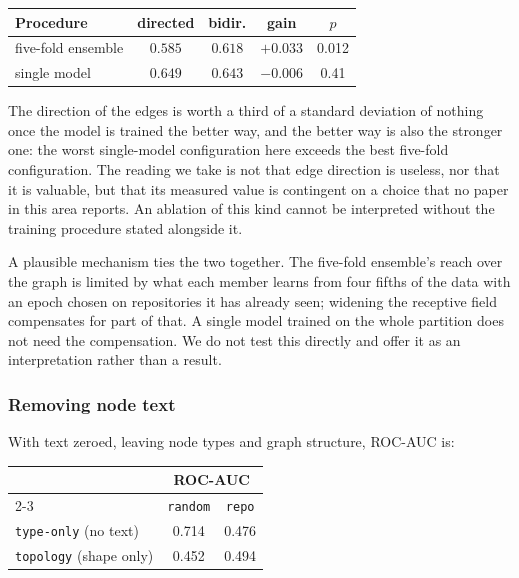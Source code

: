\begin{center}
\small
\small
\begin{tabular}{lcccc}
\toprule
\textbf{Procedure} & \textbf{directed} & \textbf{bidir.} & \textbf{gain} & \textbf{$p$} \\
\midrule
five-fold ensemble & $0.585$ & $0.618$ & $+0.033$ & 0.012 \\
single model       & $0.649$ & $0.643$ & $-0.006$ & 0.41 \\
\bottomrule
\end{tabular}
\end{center}

\noindent The direction of the edges is worth a third of a standard deviation
of nothing once the model is trained the better way, and the better way is also
the stronger one: the worst single-model configuration here exceeds the best
five-fold configuration. The reading we take is not that edge direction is
useless, nor that it is valuable, but that its measured value is contingent on
a choice that no paper in this area reports. An ablation of this kind cannot be
interpreted without the training procedure stated alongside it.

A plausible mechanism ties the two together. The five-fold ensemble's reach
over the graph is limited by what each member learns from four fifths of the
data with an epoch chosen on repositories it has already seen; widening the
receptive field compensates for part of that. A single model trained on the
whole partition does not need the compensation. We do not test this directly
and offer it as an interpretation rather than a result.

\subsubsection{Removing node text}
With text zeroed, leaving node types and graph structure, ROC-AUC is:

\begin{center}
\begin{tabular}{lcc}
\toprule
& \multicolumn{2}{c}{\textbf{ROC-AUC}} \\
\cmidrule(lr){2-3}
& \texttt{random} & \texttt{repo} \\
\midrule
\texttt{type-only} (no text) & 0.714 & 0.476 \\
\texttt{topology} (shape only) & 0.452 & 0.494 \\
\bottomrule
\end{tabular}
\end{center}

